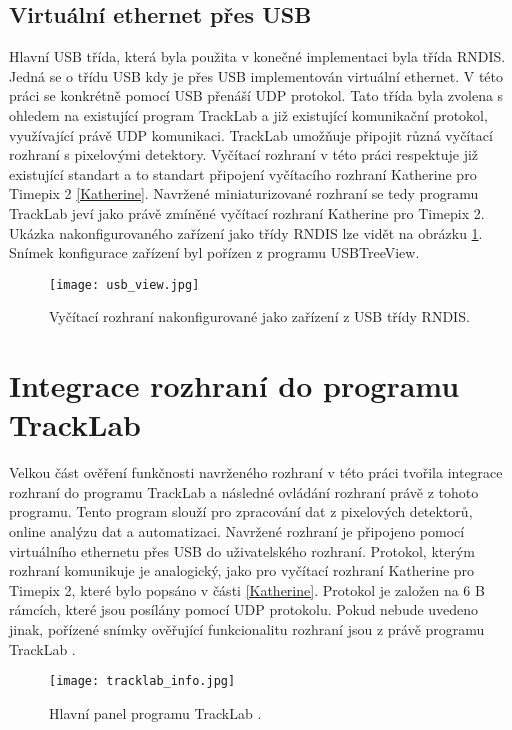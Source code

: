 \subsection{Virtuální ethernet přes USB}
Hlavní USB třída, která byla použita v konečné implementaci byla třída RNDIS. Jedná se o třídu USB kdy je přes USB implementován virtuální ethernet. V této práci se konkrétně pomocí USB přenáší UDP protokol. Tato třída byla zvolena s ohledem na existující program TrackLab \cite{Manek_2024} a již existující komunikační protokol, využívající právě UDP komunikaci. TrackLab umožňuje připojit různá vyčítací rozhraní s pixelovými detektory. Vyčítací rozhraní v této práci respektuje již existující standart a to standart připojení vyčítacího rozhraní Katherine pro Timepix 2 \ref{Katherine}. Navržené miniaturizované rozhraní se tedy programu TrackLab jeví jako právě zmíněné vyčítací rozhraní Katherine pro Timepix 2. Ukázka nakonfigurovaného zařízení jako třídy RNDIS lze vidět na obrázku \ref{fig:RNDIS}. Snímek konfigurace zařízení byl pořízen z programu USBTreeView. 
\begin{figure}[h!]
	\centering
	\captionsetup{justification=centering}
	\texttt{[image: usb\_view.jpg]}
	\caption{Vyčítací rozhraní nakonfigurované jako zařízení z USB třídy RNDIS.} 
	\label{fig:RNDIS}
\end{figure}

\section{Integrace rozhraní do programu TrackLab}
Velkou část ověření funkčnosti navrženého rozhraní v této práci tvořila integrace rozhraní do programu TrackLab \cite{Manek_2024} a následné ovládání rozhraní právě z tohoto programu. Tento program slouží pro zpracování dat z pixelových detektorů, online analýzu dat a automatizaci. Navržené rozhraní je připojeno pomocí virtuálního ethernetu přes USB do uživatelského rozhraní. Protokol, kterým rozhraní komunikuje je analogický, jako pro vyčítací rozhraní Katherine pro Timepix 2, které bylo popsáno v části \ref{Katherine}. Protokol je založen na 6 B rámcích, které jsou posílány pomocí UDP protokolu. Pokud nebude uvedeno jinak, pořízené snímky ověřující funkcionalitu rozhraní jsou z právě programu TrackLab \cite{Manek_2024}.

\begin{figure}[h!]
	\centering
	\captionsetup{justification=centering}
	\texttt{[image: tracklab\_info.jpg]}
	\caption{Hlavní panel programu TrackLab \cite{Manek_2024}.} 
	\label{fig:Tracklab}
\end{figure}

